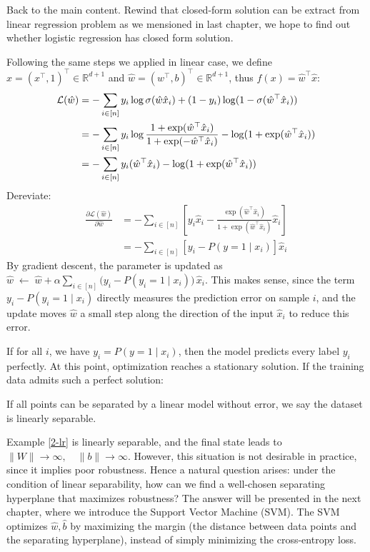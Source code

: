 \documentclass[../main]{subfiles}
\begin{document}
\vspace{1em}
Back to the main content. Rewind that closed-form solution can be extract from linear regression problem as we mensioned in last chapter, we hope to find out whether logistic regression has closed form solution.

Following the same steps we applied in linear case, we define $\hat x=(x^\top,1)^\top\in\mathbb R^{d+1}$ and $\hat w=(w^\top,b)^{\top}\in\mathbb R^{d+1}$, thus $f(x)=\hat w^\top \hat x$:
\begin{align}
  \mathcal L(\hat w)&=-\sum_{i\in[n]}y_i\log\sigma(\hat w\hat x_i)+(1-y_i)\log(1-\sigma(\hat w^\top\hat x_i))\notag\\
  &=-\sum_{i\in[n]}y_i\log\frac{1+\exp(\hat w^\top\hat x_i)}{1+\exp(-\hat w^\top\hat x_i)}-\log(1+\exp(\hat w^\top\hat x_i))\notag\\
  &=-\sum_{i\in[n]}y_i(\hat w^\top\hat x_i)-\log(1+\exp(\hat w^\top\hat x_i))
\end{align}
Dereviate:
\begin{align}
  \frac{\partial\mathcal L(\hat w)}{\partial \hat w}&=-\sum_{i\in[n]}\left[y_i\hat x_i-\frac{\exp(\hat w^\top\hat x_i)}{1+\exp(\hat w^\top\hat x_i)}\hat x_i\right]\\
  &=-\sum_{i\in [n]}\left[y_i-P(y=1\mid x_i)\right]\hat x_i
\end{align}
By gradient descent, the parameter is updated as$
  \hat w \;\leftarrow\; \hat w + \alpha \sum_{i \in [n]} \Big(y_i - P(y_i=1 \mid x_i)\Big)\,\hat x_i .$
This makes sense, since the term $y_i - P(y_i=1 \mid x_i)$ directly measures the prediction error on sample $i$, and the update moves $\hat w$ a small step along the direction of the input $\hat x_i$ to reduce this error.

If for all $i$, we have $y_i = P(y=1 \mid x_i)$, then the model predicts every label $y_i$ perfectly. At this point, optimization reaches a stationary solution. If the training data admits such a perfect solution:
\begin{definition}
  If all points can be separated by a linear model without error, we say the dataset is {linearly separable}.
\end{definition}

Example \ref{2-lr} is linearly separable, and the final state leads to $\|W\| \to \infty, \quad \|b\| \to \infty$. However, this situation is not desirable in practice, since it implies poor robustness. Hence a natural question arises: under the condition of linear separability, how can we find a well-chosen separating hyperplane that maximizes robustness? The answer will be presented in the next chapter, where we introduce the Support Vector Machine (SVM). The SVM optimizes $\hat w, \hat b$ by maximizing the margin (the distance between data points and the separating hyperplane), instead of simply minimizing the cross-entropy loss.
\end{document}
